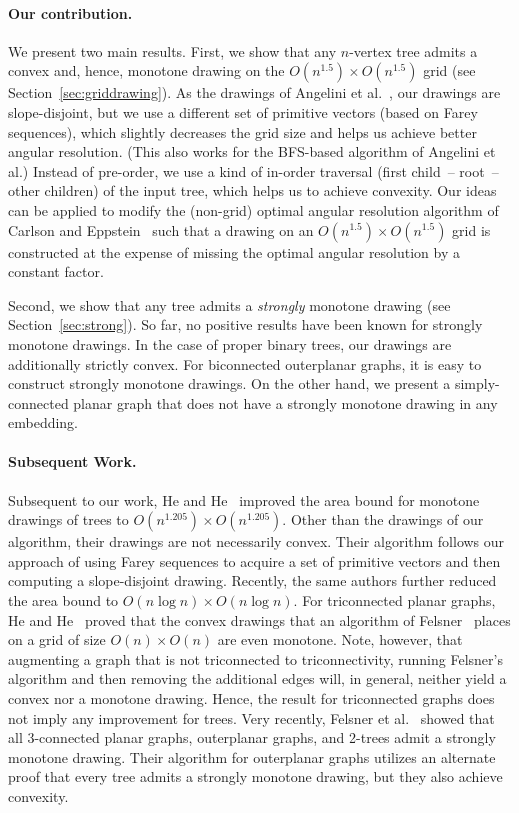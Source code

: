 \documentclass[a4paper,11pt]{article}
\theoremstyle{plain}
\begin{document}
\paragraph{Our contribution.} 
We present two main results.  First, we show that any $n$-vertex tree
admits a convex and, hence, monotone drawing on the $O(n^{1.5}) \times
O(n^{1.5})$ grid (see Section~\ref{sec:griddrawing}).  As the drawings of
Angelini et al.~\cite{acbfp-mdg-12}, our drawings are slope-disjoint, but
we use a different set of primitive vectors (based on Farey sequences),
which slightly decreases the grid size and helps us achieve better angular resolution.  (This also works
for the BFS-based algorithm of Angelini et al.)  Instead of pre-order,
we use a kind of in-order traversal (first child~-- root~-- other 
children) of the input tree, which helps us to achieve convexity.
Our ideas can be applied to modify the (non-grid) optimal angular resolution 
algorithm of Carlson and Eppstein~\cite{ce-tcfoa-GD06} such that
a drawing on an $O(n^{1.5}) \times
O(n^{1.5})$ grid is constructed at the expense of missing the optimal
angular resolution by a constant factor. 

Second, we show that any tree admits a \emph{strongly} monotone
drawing (see Section~\ref{sec:strong}).  So far, no positive results
have been known for strongly monotone drawings.
In the case of proper binary trees, 
our drawings are additionally strictly convex.  For biconnected outerplanar
graphs, it is easy to construct strongly monotone drawings.  On the
other hand, we present a simply-connected planar
graph that does not have a strongly monotone drawing in any embedding.

\paragraph{Subsequent Work.} Subsequent to our work, He and He~\cite{hh-cmdt-COCOON15} 
improved the area bound for monotone drawings of trees to 
$O(n^{1.205}) \times O(n^{1.205})$.  Other than the drawings of
  our algorithm, their drawings are not necessarily convex.  Their
algorithm follows our approach  
of using Farey sequences to acquire a set of primitive vectors and then
computing a slope-disjoint
drawing. Recently, the same authors \cite{hh-nomdot-TCS16}
  further reduced the area bound to $O(n\log n)\times O(n\log n)$.
For triconnected planar graphs, He and He~\cite{hh-md3cp-ESA15} proved
that the convex drawings that an algorithm of
Felsner~\cite{f-cdpgo-O01} places on a grid of size $O(n) \times O(n)$
are even monotone.  Note, however, that augmenting a graph that is not triconnected to triconnectivity, running Felsner's algorithm and then
removing the additional edges will, in general, neither yield a convex
nor a monotone drawing.  Hence, the result for triconnected graphs
does not imply any improvement for trees.
Very recently, Felsner et al.~\cite{fikkms-smdpg-socg16} showed that
all 3-connected planar graphs, outerplanar graphs, and 2-trees admit a strongly
monotone drawing. Their algorithm for outerplanar graphs utilizes an alternate
proof that every tree admits a strongly monotone drawing, but they also achieve
convexity.
\end{document}
